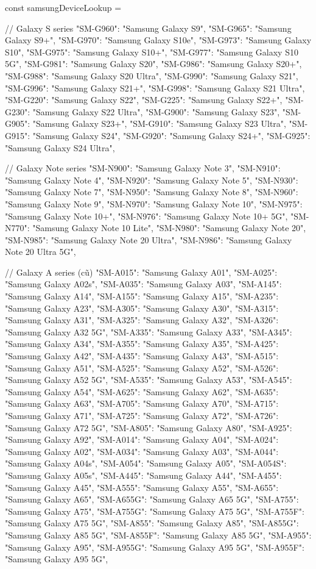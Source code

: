 const samsungDeviceLookup = {
  // Galaxy S series
  "SM-G960": "Samsung Galaxy S9",
  "SM-G965": "Samsung Galaxy S9+",
  "SM-G970": "Samsung Galaxy S10e",
  "SM-G973": "Samsung Galaxy S10",
  "SM-G975": "Samsung Galaxy S10+",
  "SM-G977": "Samsung Galaxy S10 5G",
  "SM-G981": "Samsung Galaxy S20",
  "SM-G986": "Samsung Galaxy S20+",
  "SM-G988": "Samsung Galaxy S20 Ultra",
  "SM-G990": "Samsung Galaxy S21",
  "SM-G996": "Samsung Galaxy S21+",
  "SM-G998": "Samsung Galaxy S21 Ultra",
  "SM-G220": "Samsung Galaxy S22",
  "SM-G225": "Samsung Galaxy S22+",
  "SM-G230": "Samsung Galaxy S22 Ultra",
  "SM-G900": "Samsung Galaxy S23",
  "SM-G905": "Samsung Galaxy S23+",
  "SM-G910": "Samsung Galaxy S23 Ultra",
  "SM-G915": "Samsung Galaxy S24",
  "SM-G920": "Samsung Galaxy S24+",
  "SM-G925": "Samsung Galaxy S24 Ultra",

  // Galaxy Note series
  "SM-N900": "Samsung Galaxy Note 3",
  "SM-N910": "Samsung Galaxy Note 4",
  "SM-N920": "Samsung Galaxy Note 5",
  "SM-N930": "Samsung Galaxy Note 7",
  "SM-N950": "Samsung Galaxy Note 8",
  "SM-N960": "Samsung Galaxy Note 9",
  "SM-N970": "Samsung Galaxy Note 10",
  "SM-N975": "Samsung Galaxy Note 10+",
  "SM-N976": "Samsung Galaxy Note 10+ 5G",
  "SM-N770": "Samsung Galaxy Note 10 Lite",
  "SM-N980": "Samsung Galaxy Note 20",
  "SM-N985": "Samsung Galaxy Note 20 Ultra",
  "SM-N986": "Samsung Galaxy Note 20 Ultra 5G",

   // Galaxy A series (cũ)
   "SM-A015": "Samsung Galaxy A01",
   "SM-A025": "Samsung Galaxy A02s",
   "SM-A035": "Samsung Galaxy A03",
   "SM-A145": "Samsung Galaxy A14",
   "SM-A155": "Samsung Galaxy A15",
   "SM-A235": "Samsung Galaxy A23",
   "SM-A305": "Samsung Galaxy A30",
   "SM-A315": "Samsung Galaxy A31",
   "SM-A325": "Samsung Galaxy A32",
   "SM-A326": "Samsung Galaxy A32 5G",
   "SM-A335": "Samsung Galaxy A33",
   "SM-A345": "Samsung Galaxy A34",
   "SM-A355": "Samsung Galaxy A35",
   "SM-A425": "Samsung Galaxy A42",
   "SM-A435": "Samsung Galaxy A43",
   "SM-A515": "Samsung Galaxy A51",
   "SM-A525": "Samsung Galaxy A52",
   "SM-A526": "Samsung Galaxy A52 5G",
   "SM-A535": "Samsung Galaxy A53",
   "SM-A545": "Samsung Galaxy A54",
   "SM-A625": "Samsung Galaxy A62",
   "SM-A635": "Samsung Galaxy A63",
   "SM-A705": "Samsung Galaxy A70",
   "SM-A715": "Samsung Galaxy A71",
   "SM-A725": "Samsung Galaxy A72",
   "SM-A726": "Samsung Galaxy A72 5G",
   "SM-A805": "Samsung Galaxy A80",
   "SM-A925": "Samsung Galaxy A92",
   "SM-A014": "Samsung Galaxy A04",
   "SM-A024": "Samsung Galaxy A02",
   "SM-A034": "Samsung Galaxy A03",
   "SM-A044": "Samsung Galaxy A04s",
   "SM-A054": "Samsung Galaxy A05",
   "SM-A054S": "Samsung Galaxy A05s",
   "SM-A445": "Samsung Galaxy A44",
   "SM-A455": "Samsung Galaxy A45",
   "SM-A555": "Samsung Galaxy A55",
   "SM-A655": "Samsung Galaxy A65",
   "SM-A655G": "Samsung Galaxy A65 5G",
   "SM-A755": "Samsung Galaxy A75",
   "SM-A755G": "Samsung Galaxy A75 5G",
   "SM-A755F": "Samsung Galaxy A75 5G",
   "SM-A855": "Samsung Galaxy A85",
   "SM-A855G": "Samsung Galaxy A85 5G",
   "SM-A855F": "Samsung Galaxy A85 5G",
   "SM-A955": "Samsung Galaxy A95",
   "SM-A955G": "Samsung Galaxy A95 5G",
   "SM-A955F": "Samsung Galaxy A95 5G",

}
